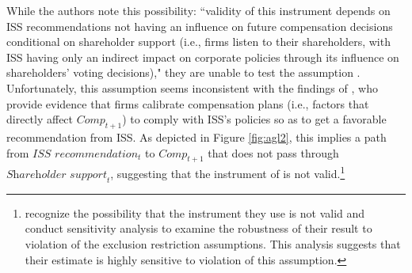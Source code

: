 \documentclass[12pt,reqno,titlepage]{amsart}
\theoremstyle{definition}
\begin{document}
\begin{doublespace}
While the authors note this possibility: ``validity of this instrument depends on ISS recommendations not having an influence on future compensation decisions conditional on shareholder support (i.e., firms listen to their shareholders, with ISS having only an indirect impact on corporate policies through its influence on shareholders' voting decisions)," they are unable to test the assumption \citep[p.\,912]{Armstrong:2013io}.
Unfortunately, this assumption seems inconsistent with the findings of \citet{Gow:2013aa}, who provide evidence that firms calibrate compensation plans (i.e., factors that directly affect $\textit{Comp}_{t+1}$) to comply with ISS's policies so as to get a favorable recommendation from ISS. 
As depicted in Figure \ref{fig:agl2}, this implies a path from $\textit{ISS recommendation}_t$ to $\textit{Comp}_{t+1}$ that does not pass through $\textit{Shareholder support}_{t}$, suggesting that the instrument of \citet[p.\,912]{Armstrong:2013io} is not valid.\footnote{\citet{Armstrong:2013io} recognize the possibility that the instrument they use is not valid and conduct sensitivity analysis to examine the robustness of their result to violation of the exclusion restriction assumptions. 
This analysis suggests that their estimate is highly sensitive to violation of this assumption.}




\end{doublespace}
\end{document}
